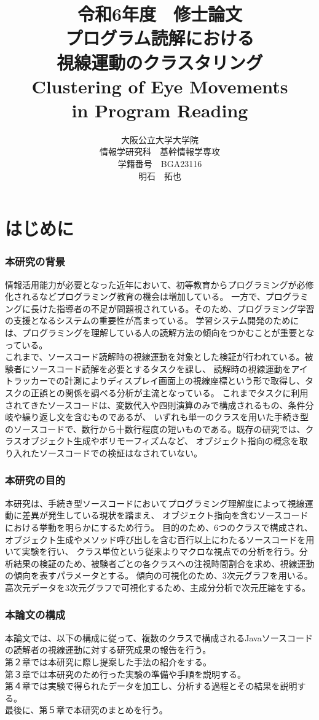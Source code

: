 \documentclass[paper=a4paper,fontsize=11pt]{jlreq}
\title{\huge 令和6年度　修士論文\\\vspace{100truept}プログラム読解における\\視線運動のクラスタリング\\
Clustering of Eye Movements\\ in Program Reading}
\author{\large 大阪公立大学大学院　\\情報学研究科　基幹情報学専攻\\学籍番号　BGA23116\\明石　拓也}
\begin{document}
\maketitle
\clearpage

\tableofcontents
\clearpage

\part{はじめに}
  \section{本研究の背景}
  情報活用能力が必要となった近年において、初等教育からプログラミングが必修化されるなどプログラミング教育の機会は増加している。
  一方で、プログラミングに長けた指導者の不足が問題視されている。そのため、プログラミング学習の支援となるシステムの重要性が高まっている。
  学習システム開発のためには、プログラミングを理解している人の読解方法の傾向をつかむことが重要となっている。\\
  これまで、ソースコード読解時の視線運動を対象とした検証が行われている。被験者にソースコード読解を必要とするタスクを課し、
  読解時の視線運動をアイトラッカーでの計測によりディスプレイ画面上の視線座標という形で取得し、タスクの正誤との関係を調べる分析が主流となっている。
  これまでタスクに利用されてきたソースコードは、変数代入や四則演算のみで構成されるもの、条件分岐や繰り返し文を含むものであるが、
  いずれも単一のクラスを用いた手続き型のソースコードで、数行から十数行程度の短いものである。既存の研究では、クラスオブジェクト生成やポリモーフィズムなど、
  オブジェクト指向の概念を取り入れたソースコードでの検証はなされていない。
  

  \section{本研究の目的}
  本研究は、手続き型ソースコードにおいてプログラミング理解度によって視線運動に差異が発生している現状を踏まえ、
  オブジェクト指向を含むソースコードにおける挙動を明らかにするため行う。
  目的のため、6つのクラスで構成され、オブジェクト生成やメソッド呼び出しを含む百行以上にわたるソースコードを用いて実験を行い、
  クラス単位という従来よりマクロな視点での分析を行う。分析結果の検証のため、被験者ごとの各クラスへの注視時間割合を求め、視線運動の傾向を表すパラメータとする。
  傾向の可視化のため、3次元グラフを用いる。高次元データを3次元グラフで可視化するため、主成分分析で次元圧縮をする。

  \section{本論文の構成}
  本論文では、以下の構成に従って、複数のクラスで構成されるJavaソースコードの読解者の視線運動に対する研究成果の報告を行う。\\
  第２章では本研究に際し提案した手法の紹介をする。\\
  第３章では本研究のため行った実験の準備や手順を説明する。\\
  第４章では実験で得られたデータを加工し、分析する過程とその結果を説明する。\\
  最後に、第５章で本研究のまとめを行う。
\end{document}
